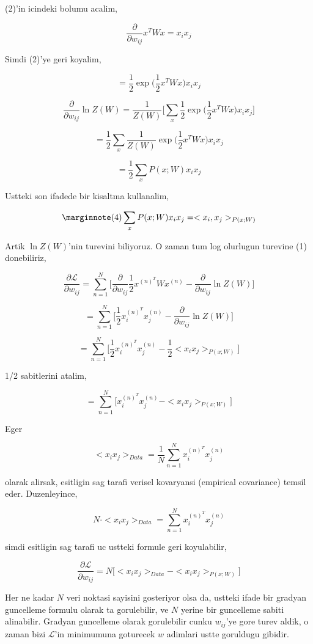 \documentclass[12pt,fleqn]{article}\usepackage{../common}
\begin{document}
(2)'in icindeki bolumu acalim,

$$ \frac{\partial}{\partial w_{ij}}x^T W x = x_i x_j $$

Simdi (2)'ye geri koyalim,

$$ =  \frac{1}{2}  \exp \big( \frac{1}{2} x^T W x \big) x_i x_j$$

$$ 
\frac{\partial}{\partial w_{ij}} \ln Z(W) = 
\frac{1}{Z(W)}
\bigg[ 
\sum_x \frac{1}{2}  \exp \big( \frac{1}{2} x^T W x \big) x_i x_j
\bigg]
$$

$$ 
= 
\frac{1}{2}  \sum_x \frac{1}{Z(W)}  \exp \big( \frac{1}{2} x^T W x \big) x_i x_j
$$

$$ 
= 
\frac{1}{2}  \sum_x P(x;W) x_i x_j
$$

Ustteki son ifadede bir kisaltma kullanalim,

$$ 
\mlabel{4}
\sum_x P(x;W) x_i x_j =  <x_i,x_j>_{P(x;W)}
$$

Artik $\ln Z(W)$'nin turevini biliyoruz. O zaman tum log olurlugun turevine
(1) donebiliriz, 

$$  
\frac{\partial \mathcal{L}}{\partial w_{ij}} = 
\sum _{n=1}^{N} \bigg[ 
\frac{\partial}{\partial w_{ij}}  \frac{1}{2} x^{(n)^T} W x^{(n)} - 
\frac{\partial}{\partial w_{ij}}  \ln Z(W) \bigg]
$$


$$  
=
\sum _{n=1}^{N} 
\bigg[ 
\frac{1}{2} x_i^{(n)^T}x_j^{(n)} - 
\frac{\partial}{\partial w_{ij}}  \ln Z(W) 
\bigg]
$$

$$  
=
\sum _{n=1}^{N} 
\bigg[ 
\frac{1}{2} x_i^{(n)^T}x_j^{(n)} - 
\frac{1}{2}<x_ix_j>_{P(x;W)}
\bigg]
$$ 

1/2 sabitlerini atalim, 

$$  
=
\sum _{n=1}^{N} 
\bigg[ 
 x_i^{(n)^T}x_j^{(n)} - <x_ix_j>_{P(x;W)}
\bigg]
$$

Eger 

$$
<x_ix_j>_{Data} = \frac{1}{N} \sum _{n=1}^{N}  x_i^{(n)^T}x_j^{(n)}
$$

olarak alirsak, esitligin sag tarafi verisel kovaryansi (empirical
covariance) temsil eder. Duzenleyince,

$$ 
N \cdot <x_ix_j>_{Data} = \sum _{n=1}^{N}  x_i^{(n)^T}x_j^{(n)}
$$

simdi esitligin sag tarafi uc ustteki formule geri koyulabilir,

$$ 
\frac{\partial \mathcal{L}}{\partial w_{ij}}  = 
N \big[<x_ix_j>_{Data}  - <x_ix_j>_{P(x;W)} \big] 
$$

Her ne kadar $N$ veri noktasi sayisini gosteriyor olsa da, ustteki ifade
bir gradyan guncelleme formulu olarak ta gorulebilir, ve $N$ yerine bir
guncelleme sabiti alinabilir. Gradyan guncelleme olarak gorulebilir cunku
$w_{ij}$'ye gore turev aldik, o zaman bizi $\mathcal{L}$'in minimumuna goturecek
$w$ adimlari ustte goruldugu gibidir. 
\end{document}
